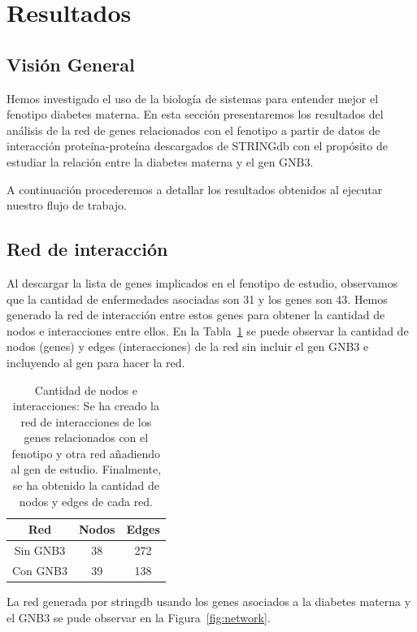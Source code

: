 
\section{Resultados}

\subsection{Visión General}

Hemos investigado el uso de la biología de sistemas para entender mejor el fenotipo diabetes materna. En esta sección presentaremos los resultados del análisis de la red de genes relacionados con el fenotipo a partir de datos de interacción proteína-proteína descargados de STRINGdb con el propósito de estudiar la relación entre la diabetes materna y el gen GNB3.

A continuación procederemos a detallar los resultados obtenidos al ejecutar nuestro flujo de trabajo.

\subsection{Red de interacción}

Al descargar la lista de genes implicados en el fenotipo de estudio, observamos que la cantidad de enfermedades asociadas son 31 y los genes son 43. Hemos generado la red de interacción entre estos genes para obtener la cantidad de nodos e interacciones entre ellos. En la Tabla~\ref{table:nodes_edges_count} se puede observar la cantidad de nodos (genes) y edges (interacciones) de la red sin incluir el gen GNB3 e incluyendo al gen para hacer la red.


\begin{table}[h]
	\centering
	\begin{tabular}{|c|c|c|}
		\hline
		Red & Nodos & Edges \\ \hline
		Sin GNB3 & 38    & 272   \\ \hline
		Con GNB3 & 39    & 138  \\ \hline
	\end{tabular}
	\caption{Cantidad de nodos e interacciones: Se ha creado la red de interacciones de los genes relacionados con el fenotipo y otra red añadiendo al gen de estudio. Finalmente, se ha obtenido la cantidad de nodos y edges de cada red.}
	\label{table:nodes_edges_count}
\end{table}

La red generada por stringdb usando los genes asociados a la diabetes materna y el GNB3 se pude observar en la Figura~\ref{fig:network}.

